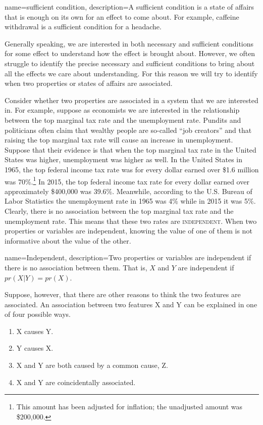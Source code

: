 {
name=sufficient condition,
description={A sufficient condition is a state of affairs that is enough on its own for an effect to come about. For example, caffeine withdrawal is a sufficient condition for a headache.}
}

Generally speaking, we are interested in both necessary and sufficient conditions for some effect to understand how the effect is brought about. However, we often struggle to identify the precise necessary and sufficient conditions to bring about all the effects we care about understanding. For this reason we will try to identify when two properties or states of affairs are associated.

Consider whether two properties are associated in a system that we are interested in. For example, suppose as economists we are interested in the relationship between the top marginal tax rate and the unemployment rate. Pundits and politicians often claim that wealthy people are so-called ``job creators'' and that raising the top marginal tax rate will cause an increase in unemployment. Suppose that their evidence is that when the top marginal tax rate in the United States was higher, unemployment was higher as well. In the United States in 1965, the top federal income tax rate was for every dollar earned over \$1.6 million was 70\%.\footnote{This amount has been adjusted for inflation; the unadjusted amount was \$200,000.} In 2015, the top federal income tax rate for every dollar earned over approximately \$400,000 was 39.6\%. Meanwhile, according to the U.S. Bureau of Labor Statistics the unemployment rate in 1965 was 4\% while in 2015 it was 5\%. Clearly, there is no association between the top marginal tax rate and the unemployment rate. This means that these two rates are \textsc{\gls{independent}}. When two properties or variables are independent, knowing the value of one of them is not informative about the value of the other.

{
name=Independent,
description={Two properties or variables are independent if there is no association between them. That is, $X$ and $Y$ are independent if $pr(X|Y)=pr(X)$.}
}

Suppose, however, that there are other reasons to think the two features are associated. An association between two features X and Y can be explained in one of four possible ways.

\begin{enumerate}
\item X causes Y.
\item Y causes X.
\item X and Y are both caused by a common cause, Z.
\item X and Y are coincidentally associated.
\end{enumerate}

